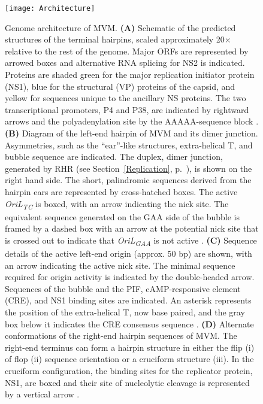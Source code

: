 \begin{figure}
\centering
  \texttt{[image: Architecture]} \\[0.35cm]
  \caption[Genome Architecture of MVM]
   {Genome architecture of MVM. \textbf{(A)} Schematic of the predicted structures of the terminal hairpins, scaled approximately 20$\times$ relative to the rest of the genome. Major ORFs are represented by arrowed boxes and alternative RNA splicing for NS2 is indicated. Proteins are shaded green for the major replication initiator protein (NS1), blue for the structural (VP) proteins of the capsid, and yellow for sequences unique to the ancillary NS proteins. The two transcriptional promoters, P4 and P38, are indicated by rightward arrows and the polyadenylation site by the AAAAA-sequence block \cite{small}. \textbf{(B)} Diagram of the left-end hairpin of MVM and its dimer junction. Asymmetries, such as the ``ear''-like structures, extra-helical T, and bubble sequence are indicated. The duplex, dimer junction, generated by RHR (see Section~\ref{Replication}, p.~\pageref{Replication}), is shown on the right hand side. The short, palindromic sequences derived from the hairpin ears are represented by cross-hatched boxes. The active \textit{OriL\textsubscript{TC}} is boxed, with an arrow indicating the nick site. The equivalent sequence generated on the GAA side of the bubble is framed by a dashed box with an arrow at the potential nick site that is crossed out to indicate that \textit{OriL\textsubscript{GAA}} is not active \cite{pmid12885883, pmid16928767}. \textbf{(C)} Sequence details of the active left-end origin (approx. 50 bp) are shown, with an arrow indicating the active nick site. The minimal sequence required for origin activity is indicated by the double-headed arrow. Sequences of the bubble and the PIF, cAMP-responsive element (CRE), and NS1 binding sites are indicated. An asterisk represents the position of the extra-helical T, now base paired, and the gray box below it indicates the CRE consensus sequence \cite{pmid12885883}. \textbf{(D)} Alternate conformations of the right-end hairpin sequences of MVM. The right-end terminus can form a hairpin structure in either the flip (i) of flop (ii) sequence orientation or a cruciform structure (iii). In the cruciform configuration, the binding sites for the replicator protein, NS1, are boxed and their site of nucleolytic cleavage is represented by a vertical arrow \cite{pmid8614999}.
} 
\label{Architecture}
\end{figure}


